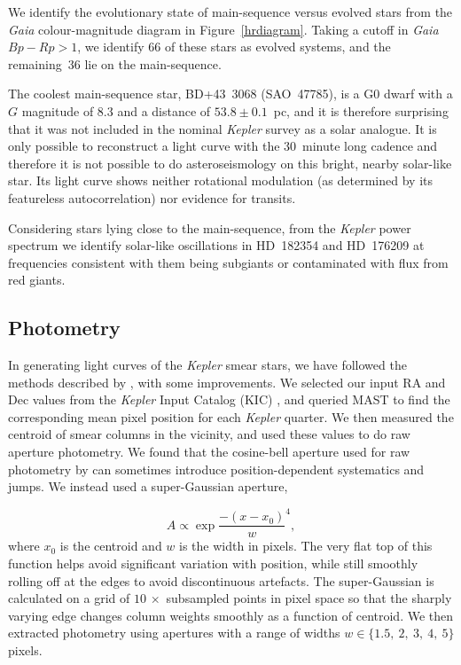 \documentclass[modern]{aastex62}
\newcommand{\kepler}{\textit{Kepler}\xspace}
\newcommand{\gaia}{\textit{Gaia}\xspace}
\begin{document}
We identify the evolutionary state of main-sequence versus evolved stars from the \gaia colour-magnitude diagram in Figure~\ref{hrdiagram}. Taking a cutoff in \gaia $Bp-Rp > 1$, we identify 66 of these stars as evolved systems, and the remaining~36 lie on the main-sequence. 

The coolest main-sequence star, BD+43~3068 (SAO~47785), is a G0 dwarf with a $G$ magnitude of 8.3 and a distance of $53.8 \pm 0.1$~pc, and it is therefore surprising that it was not included in the nominal \kepler survey as a solar analogue. It is only possible to reconstruct a light curve with the 30~minute long cadence and therefore it is not possible to do asteroseismology on this bright, nearby solar-like star. Its light curve shows neither rotational modulation (as determined by its featureless autocorrelation) nor evidence for transits.

Considering stars lying close to the main-sequence, from the \kepler power spectrum we identify solar-like oscillations in HD~182354 and HD~176209 at frequencies consistent with them being subgiants or contaminated with flux from red giants. 


\subsection{Photometry}
\label{photometry}

In generating light curves of the \kepler smear stars, we have followed the methods described by \citet{smear}, with some improvements. We selected our input RA and Dec values from the \kepler Input Catalog (KIC) \citep{kic}, and queried MAST to find the corresponding mean pixel position for each \kepler quarter. We then measured the centroid of smear columns in the vicinity, and used these values to do raw aperture photometry. We found that the cosine-bell aperture used for raw photometry by \citet{smear} can sometimes introduce position-dependent systematics and jumps. We instead used a super-Gaussian aperture, 

\begin{equation}
A \propto \exp{\dfrac{-(x-x_0)}{w} ^ 4},
\end{equation}
\noindent where $x_0$ is the centroid and $w$ is the width in pixels. The very flat top of this function helps avoid significant variation with position, while still smoothly rolling off at the edges to avoid discontinuous artefacts. The super-Gaussian is calculated on a grid of $10\,\times$ subsampled points in pixel space so that the sharply varying edge changes column weights smoothly as a function of centroid. We then extracted photometry using apertures with a range of widths $w \in\{1.5,~2,~3,~4,~5\}$ pixels.
\end{document}

